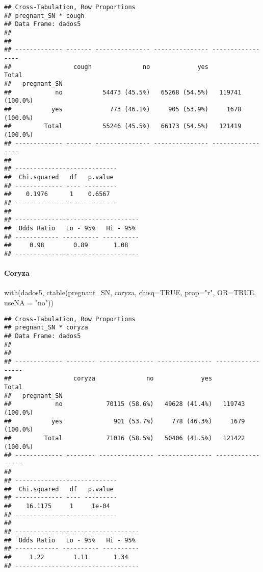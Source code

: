 \documentclass[
]{article}
\newenvironment{Shaded}{\begin{snugshade}}{\end{snugshade}}
\newcommand{\AttributeTok}[1]{\textcolor[rgb]{0.77,0.63,0.00}{#1}}
\newcommand{\ConstantTok}[1]{\textcolor[rgb]{0.00,0.00,0.00}{#1}}
\newcommand{\FunctionTok}[1]{\textcolor[rgb]{0.00,0.00,0.00}{#1}}
\newcommand{\NormalTok}[1]{#1}
\newcommand{\StringTok}[1]{\textcolor[rgb]{0.31,0.60,0.02}{#1}}
\begin{document}
\begin{verbatim}
## Cross-Tabulation, Row Proportions  
## pregnant_SN * cough  
## Data Frame: dados5  
## 
## 
## ------------- ------- --------------- --------------- -----------------
##                 cough              no             yes             Total
##   pregnant_SN                                                          
##            no           54473 (45.5%)   65268 (54.5%)   119741 (100.0%)
##           yes             773 (46.1%)     905 (53.9%)     1678 (100.0%)
##         Total           55246 (45.5%)   66173 (54.5%)   121419 (100.0%)
## ------------- ------- --------------- --------------- -----------------
## 
## ----------------------------
##  Chi.squared   df   p.value 
## ------------- ---- ---------
##    0.1976      1    0.6567  
## ----------------------------
## 
## ----------------------------------
##  Odds Ratio   Lo - 95%   Hi - 95% 
## ------------ ---------- ----------
##     0.98        0.89       1.08   
## ----------------------------------
\end{verbatim}

\hypertarget{coryza}{%
\paragraph{\texorpdfstring{{ Coryza }}{ Coryza }}\label{coryza}}

\begin{Shaded}
\begin{Highlighting}[]
\FunctionTok{with}\NormalTok{(dados5, }\FunctionTok{ctable}\NormalTok{(pregnant\_SN, coryza, }\AttributeTok{chisq=}\ConstantTok{TRUE}\NormalTok{, }\AttributeTok{prop=}\StringTok{"r"}\NormalTok{, }\AttributeTok{OR=}\ConstantTok{TRUE}\NormalTok{, }\AttributeTok{useNA =} \StringTok{"no"}\NormalTok{))}
\end{Highlighting}
\end{Shaded}

\begin{verbatim}
## Cross-Tabulation, Row Proportions  
## pregnant_SN * coryza  
## Data Frame: dados5  
## 
## 
## ------------- -------- --------------- --------------- -----------------
##                 coryza              no             yes             Total
##   pregnant_SN                                                           
##            no            70115 (58.6%)   49628 (41.4%)   119743 (100.0%)
##           yes              901 (53.7%)     778 (46.3%)     1679 (100.0%)
##         Total            71016 (58.5%)   50406 (41.5%)   121422 (100.0%)
## ------------- -------- --------------- --------------- -----------------
## 
## ----------------------------
##  Chi.squared   df   p.value 
## ------------- ---- ---------
##    16.1175     1     1e-04  
## ----------------------------
## 
## ----------------------------------
##  Odds Ratio   Lo - 95%   Hi - 95% 
## ------------ ---------- ----------
##     1.22        1.11       1.34   
## ----------------------------------
\end{verbatim}
\end{document}
